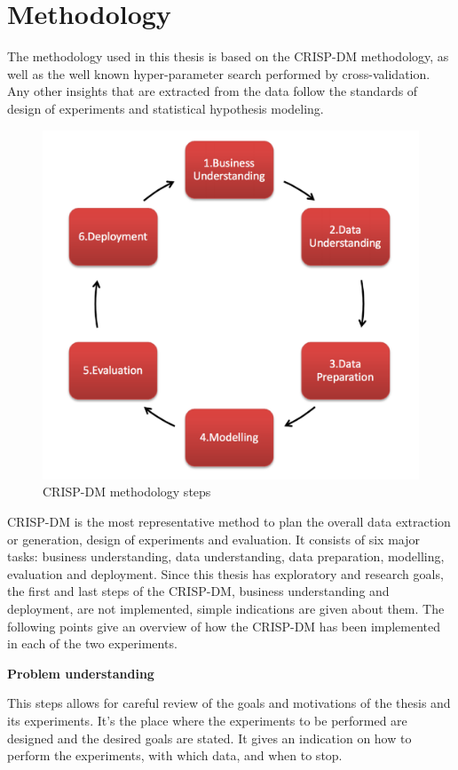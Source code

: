 \newpage
\section{Methodology}

The methodology used in this thesis is based on the CRISP-DM methodology, as well as the well known hyper-parameter search performed by cross-validation. Any other insights that are extracted from the data follow the standards of design of experiments and statistical hypothesis modeling.

\begin{figure}[H]
    \centering
        \includegraphics[width=0.6\linewidth]{img/crisp-dm.png}
    \caption{CRISP-DM methodology steps}\label{fig:crisp}
\end{figure}


CRISP-DM is the most representative method to plan the overall data extraction or generation, design of experiments and evaluation. It consists of six major tasks: business understanding, data understanding, data preparation, modelling, evaluation and deployment. Since this thesis has exploratory and research goals, the first and last steps of the CRISP-DM, business understanding and deployment, are not implemented, simple indications are given about them. The following points give an overview of how the CRISP-DM has been implemented in each of the two experiments.

\textbf{Problem understanding}

This steps allows for careful review of the goals and motivations of the thesis and its experiments. It's the place where the experiments to be performed are designed and the desired goals are stated. It gives an indication on how to perform the experiments, with which data, and when to stop.


